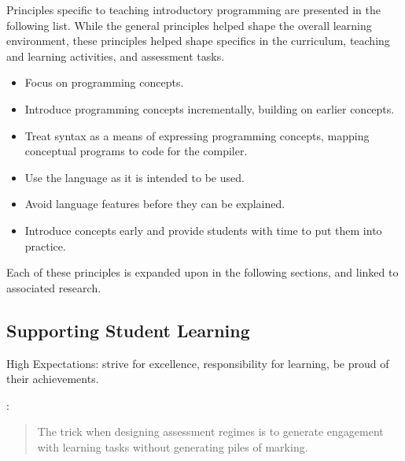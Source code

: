 




Principles specific to teaching introductory programming are presented in the following list. While the general principles helped shape the overall learning environment, these principles helped shape specifics in the curriculum, teaching and learning activities, and assessment tasks.

\begin{itemize}
	\item Focus on programming concepts.
	\item Introduce programming concepts incrementally, building on earlier concepts.
	\item Treat syntax as a means of expressing programming concepts, mapping conceptual programs to code for the compiler.
	\item Use the language as it is intended to be used.
	\item Avoid language features before they can be explained.
	\item Introduce concepts early and provide students with time to put them into practice.
\end{itemize}

Each of these principles is expanded upon in the following sections, and linked to associated research.






\subsection{Supporting Student Learning} %
\label{sub:supporting_student_learning}

High Expectations: strive for excellence, responsibility for learning, be proud of their achievements.

\citet{Chickering:1987}:

\citet{Gibbs:2004} 

\begin{quote}
	The trick when designing assessment regimes is to generate engagement with learning tasks without generating piles of marking.
\end{quote}

